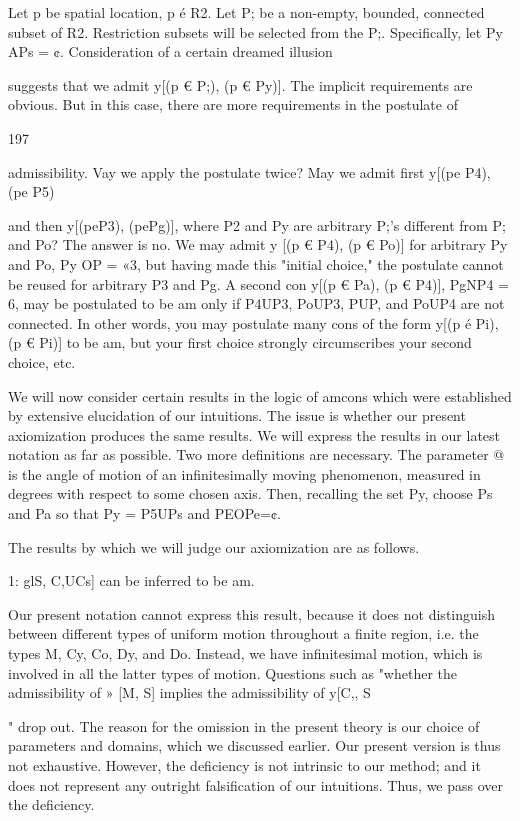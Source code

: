 \documentclass[10pt,twoside]{memoir}
\begin{document}
\begin{enumerate}
{{{{{Let p be spatial location, p é R2. Let P; be a non-empty, bounded, 
connected subset of R2. Restriction subsets will be selected from the P;. 
Specifically, let Py APs = ¢. Consideration of a certain dreamed illusion 


suggests that we admit y[(p € P;), (p € Py)]. The implicit requirements are 
obvious. But in this case, there are more requirements in the postulate of 


197 


admissibility. Vay we apply the postulate twice? May we admit first y[(pe 
P4), (pe P5)} and then y[(peP3), (pePg)], where P2 and Py are arbitrary 
P;'s different from P; and Po? The answer is no. We may admit y [(p € P4), 
(p € Po)] for arbitrary Py and Po, Py OP = «3, but having made this "initial 
choice," the postulate cannot be reused for arbitrary P3 and Pg. A second 
con y[(p € Pa), (p € P4)], PgNP4 = 6, may be postulated to be am only if 
P4UP3, PoUP3, PUP, and PoUP4 are not connected. In other words, you 
may postulate many cons of the form y[(p é Pi), (p € Pi)] to be am, but 
your first choice strongly circumscribes your second choice, etc. 

We will now consider certain results in the logic of amcons which were 
established by extensive elucidation of our intuitions. The issue is whether 
our present axiomization produces the same results. We will express the 
results in our latest notation as far as possible. Two more definitions are 
necessary. The parameter @ is the angle of motion of an infinitesimally 
moving phenomenon, measured in degrees with respect to some chosen axis. 
Then, recalling the set Py, choose Ps and Pa so that Py = P5UPs and 
PEOPe=¢. 

The results by which we will judge our axiomization are as follows. 

1: glS, C,UCs] can be inferred to be am. 

Our present notation cannot express this result, because it does not 
distinguish between different types of uniform motion throughout a finite 
region, i.e. the types M, Cy, Co, Dy, and Do. Instead, we have infinitesimal 
motion, which is involved in all the latter types of motion. Questions such as 
"whether the admissibility of » [M, S] implies the admissibility of y[C,, S}" 
drop out. The reason for the omission in the present theory is our choice of 
parameters and domains, which we discussed earlier. Our present version is 
thus not exhaustive. However, the deficiency is not intrinsic to our method; 
and it does not represent any outright falsification of our intuitions. Thus, 
we pass over the deficiency. 

}}}
\end{enumerate}
\end{document}
